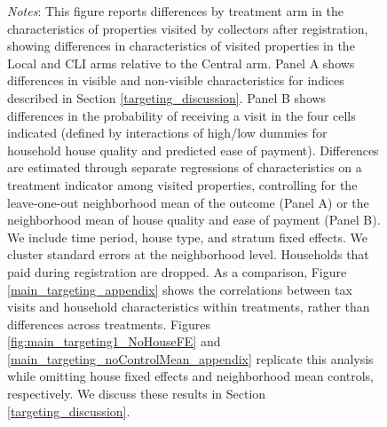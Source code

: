 \documentclass[12pt,english]{article}
\renewcommand{\footnotesize}{\fontsize{9pt}{11pt}\selectfont}\usepackage[unicode=true,
\begin{document}
\begin{figure}[H]
\parbox{6in}{\footnotesize \textit{Notes}: This figure reports differences by treatment arm in the characteristics of properties visited by collectors after registration, showing differences in characteristics of visited properties in the Local and CLI arms relative to the Central arm.  Panel A shows differences in visible and non-visible characteristics for indices described in Section \ref{targeting_discussion}.  Panel B shows differences in the probability of receiving a visit in the four cells indicated (defined by interactions of high/low dummies for household house quality and predicted ease of payment). Differences are estimated through separate regressions of characteristics on a treatment indicator among visited properties, controlling for the leave-one-out neighborhood mean of the outcome (Panel A) or the neighborhood mean of house quality and ease of payment (Panel B). We include time period, house type, and stratum fixed effects. We cluster standard errors at the neighborhood level. Households that paid during registration are dropped. As a comparison, Figure \ref{main_targeting_appendix} shows the correlations between tax visits and household characteristics within treatments, rather than differences across treatments. Figures \ref{fig:main_targeting1_NoHouseFE} and \ref{main_targeting_noControlMean_appendix} replicate this analysis while omitting house fixed effects and neighborhood mean controls, respectively. We discuss these results in Section \ref{targeting_discussion}.}
\end{figure}

\end{document}
